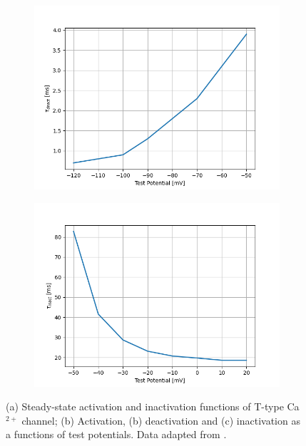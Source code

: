 \documentclass[../../workflow.tex]{subfiles}
\begin{document}
\begin{figure}[!b]
    \begin{subfigure}[t]{0.45\textwidth}
        \centering
        \includegraphics[width=\textwidth]{./img/t_type_calcium_channel/2_1_tau_r_jeong.png}
        \caption{}
    \end{subfigure}
    \hfill
    \begin{subfigure}[t]{0.45\textwidth}
        \centering
        \includegraphics[width=\textwidth]{./img/t_type_calcium_channel/2_1_tau_h_jeong.png}
        \caption{}
    \end{subfigure}
    
    \caption{
        (a) Steady-state activation and inactivation functions of T-type Ca$^{2+}$ channel;
        (b) Activation, (b) deactivation and (c) inactivation as a functions of test potentials.
        Data adapted from \cite{jeongCaa1TFlyTtype2015}.
    }
    \label{fig:data_from_jeong}
\end{figure}
\end{document}
